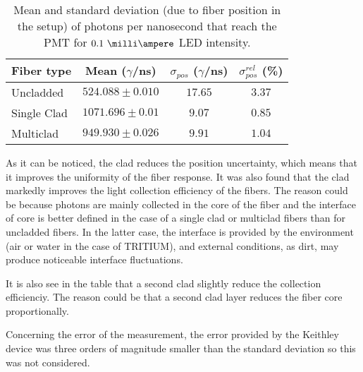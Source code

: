 \begin{table}[htbp]
\centering{}%
\begin{tabular}{lccc}
\toprule 
Fiber type & Mean ($\gamma$/ns) & $\sigma_{pos}$ ($\gamma$/ns) & $\sigma^{rel}_{pos}$ (\%) \tabularnewline
\midrule
\midrule 
Uncladded & $524.088 \pm 0.010$ & $17.65$ & $3.37$ \tabularnewline
Single Clad & $1071.696 \pm 0.01$ & $9.07$ & $0.85$ \tabularnewline
Multiclad & $949.930 \pm 0.026$ & $9.91$ & $1.04$ \tabularnewline
\bottomrule
\end{tabular}
\caption{Mean and standard deviation (due to fiber position in the setup) of photons per nanosecond that reach the PMT for $0.1~\milli\ampere$ LED intensity.}
\label{tab:PositionStandardDeviation}
\end{table}
As it can be noticed, the clad reduces the position uncertainty, which means that it improves the uniformity of the fiber response. It was also found that the clad markedly improves the light collection efficiency of the fibers. The reason could be because photons are mainly collected in the core of the fiber and the interface of core is better defined in the case of a single clad or multiclad fibers than for uncladded fibers. In the latter case, the interface is provided by the environment (air or water in the case of TRITIUM), and external conditions, as dirt, may produce noticeable interface fluctuations.

It is also see in the table that a second clad slightly reduce the collection efficienciy. The reason could be that a second clad layer reduces the fiber core proportionally.



Concerning the error of the measurement, the error provided by the Keithley device was three orders of magnitude smaller than the standard deviation so this was not considered.


